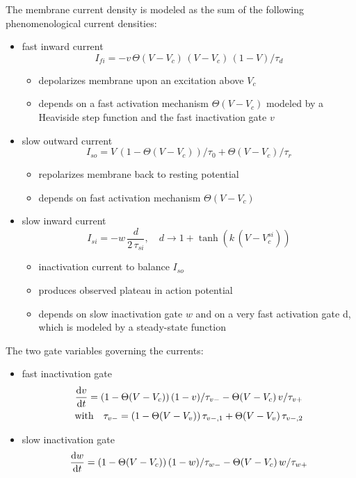 The membrane current density is modeled as the sum of the following
phenomenological current densities:
\begin{itemize}
    \item fast inward current
        \[I_{fi}=-v\,\Theta(V-V_c)\,(V-V_c)\,(1-V)/\tau_d\]
    \begin{itemize}
        \item depolarizes membrane upon an excitation above $V_c$
        \item depends on a fast activation mechanism $\Theta(V-V_c)$ modeled by
            a Heaviside step function and the fast inactivation gate $v$
    \end{itemize}

    \item slow outward current
        \[I_{so}=V\,(1-\Theta(V-V_c))/\tau_0+\Theta(V-V_c)/\tau_r\]
    \begin{itemize}
        \item repolarizes membrane back to resting potential
        \item depends on fast activation mechanism $\Theta(V-V_c)$
    \end{itemize}

    \item slow inward current
        \[I_{si}=-w\,\frac{d}{2\,\tau_{si}},\quad
            d\to 1+\tanh(k\,(V-V_{c}^{si}))\]
    \begin{itemize}
        \item inactivation current to balance $I_{so}$
        \item produces observed plateau in action potential
        \item depends on slow inactivation gate $w$ and on a very fast
            activation gate d, which is modeled by a steady-state
            function
    \end{itemize}
\end{itemize}

The two gate variables governing the currents:
\begin{itemize}
    \item fast inactivation gate
        \begin{gather}
            \dv{v}{t}=(1-\Theta(V-V_c))\,(1-v)/\tau_{v-}
            -\Theta(V-V_c)\,v/\tau_{v+} \label{eq:v} \\
            \qq*{with}
            \tau_{v-}=(1-\Theta(V-V_v))\,\tau_{v-,1}
                +\Theta(V-V_v)\,\tau_{v-,2} \nonumber
        \end{gather}
    \item slow inactivation gate
        \begin{equation}
            \dv{w}{t}=(1-\Theta(V-V_c))\,(1-w)/\tau_{w-}
            -\Theta(V-V_c)\,w/\tau_{w+} \label{eq:w}
        \end{equation}
\end{itemize}

